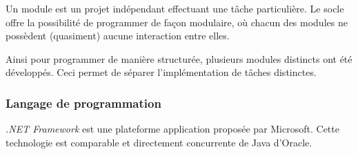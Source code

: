 
Un module est un projet indépendant effectuant une tâche particulière.
Le socle offre la possibilité de programmer de façon modulaire, où chacun des modules ne possèdent (quasiment) aucune interaction entre elles.

Ainsi pour programmer de manière structurée, plusieurs modules distincts ont été développés.
Ceci permet de séparer l'implémentation de tâches distinctes.


\subsubsection{Langage de programmation}


\textit{.NET Framework} est une plateforme application proposée par Microsoft.
Cette technologie est comparable et directement concurrente de Java d'Oracle.

